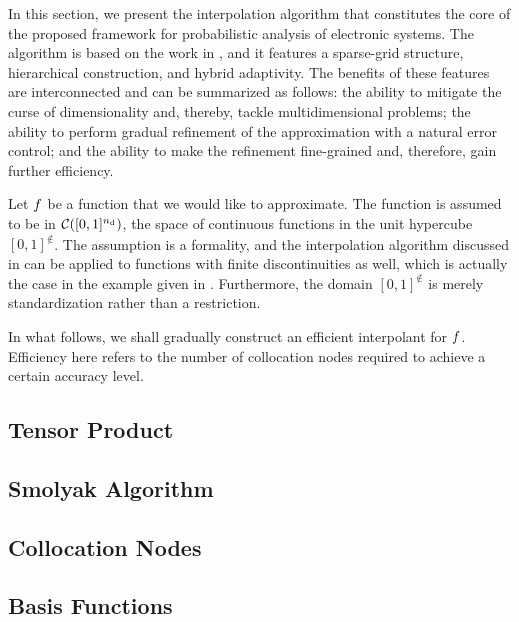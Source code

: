 In this section, we present the interpolation algorithm that constitutes the
core of the proposed framework for probabilistic analysis of electronic systems.
The algorithm is based on the work in \cite{jakeman2012, klimke2006, ma2009},
and it features a sparse-grid structure, hierarchical construction, and hybrid
adaptivity. The benefits of these features are interconnected and can be
summarized as follows: the ability to mitigate the curse of dimensionality and,
thereby, tackle multidimensional problems; the ability to perform gradual
refinement of the approximation with a natural error control; and the ability to
make the refinement fine-grained and, therefore, gain further efficiency.

Let $f$ be a function that we would like to approximate. The function is
assumed to be in $\mathcal{C}([0, 1]^{n_\text{d}})$, the space of continuous functions
in the unit hypercube $[0, 1]^\nin$. The assumption is a formality, and the
interpolation algorithm discussed in  can be applied to
functions with finite discontinuities as well, which is actually the case in the
example given in . Furthermore, the domain $[0, 1]^\nin$ is
merely standardization rather than a restriction.

In what follows, we shall gradually construct an efficient interpolant for $f$.
Efficiency here refers to the number of collocation nodes required to achieve a
certain accuracy level.

\subsection{Tensor Product}


\subsection{Smolyak Algorithm} 


\subsection{Collocation Nodes} 


\subsection{Basis Functions} 


